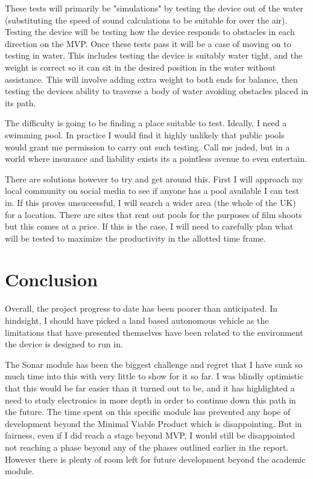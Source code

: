 \documentclass[11pt,a4paper,titlepage]{report}
\begin{document}
	These tests will primarily be "simulations" by testing the device out of the water (substituting the speed of sound calculations to be suitable for over the air). Testing the device will be testing how the device responds to obstacles in each direction on the MVP. Once these tests pass it will be a case of moving on to testing in water. This includes testing the device is suitably water tight, and the weight is correct so it can sit in the desired position in the water without assistance. This will involve adding extra weight to both ends for balance, then testing the devices ability to traverse a body of water avoiding obstacles placed in its path. 
	
	The difficulty is going to be finding a place suitable to test. Ideally, I need a swimming pool. In practice I would find it highly unlikely that public pools would grant me permission to carry out such testing. Call me jaded, but in a world where insurance and liability exists its a pointless avenue to even entertain. 
	
	There are solutions however to try and get around this. First I will approach my local community on social media to see if anyone has a pool available I can test in. If this proves unsuccessful, I will search a wider area (the whole of the UK) for a location. There are sites that rent out pools for the purposes of film shoots but this comes at a price. If this is the case, I will need to carefully plan what will be tested to maximize the productivity in the allotted time frame.
	
	\chapter*{Conclusion}
	
	Overall, the project progress to date has been poorer than anticipated. In hindsight, I should have picked a land based autonomous vehicle as the limitations that have presented themselves have been related to the environment the device is designed to run in. 
	
	The Sonar module has been the biggest challenge and regret that I have sunk so much time into this with very little to show for it so far. I was blindly optimistic that this would be far easier than it turned out to be, and it has highlighted a need to study electronics in more depth in order to continue down this path in the future. The time spent on this specific module has prevented any hope of development beyond the Minimal Viable Product which is disappointing. But in fairness, even if I did reach a stage beyond MVP, I would still be disappointed not reaching a phase beyond any of the phases outlined earlier in the report. However there is plenty of room left for future development beyond the academic module. 
	
\end{document}

